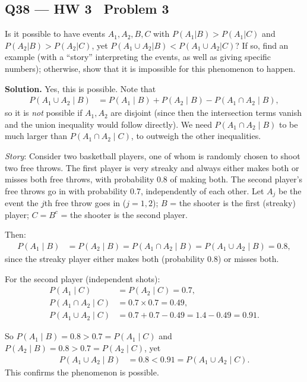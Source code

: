 \documentclass[11pt]{article}
\begin{document}
\subsection*{Q38 --- HW 3 \textperiodcentered\ Problem 3}
\begin{qbox}
Is it possible to have events $A_1, A_2, B, C$ with $P(A_1|B) > P(A_1|C)$ and $P(A_2|B) > P(A_2|C)$, yet $P(A_1 \cup A_2|B) < P(A_1 \cup A_2|C)$? If so, find an example (with a ``story'' interpreting the events, as well as giving specific numbers); otherwise, show that it is impossible for this phenomenon to happen.
\end{qbox}
\textbf{Solution.} Yes, this is possible. Note that
\begin{align*}
P(A_1\cup A_2\mid B) &= P(A_1\mid B)+P(A_2\mid B)-P(A_1\cap A_2\mid B),
\end{align*}
so it is \emph{not} possible if $A_1,A_2$ are disjoint (since then the intersection terms vanish and the union inequality would follow directly). We need $P(A_1\cap A_2\mid B)$ to be much larger than $P(A_1\cap A_2\mid C)$, to outweigh the other inequalities.

\textit{Story}: Consider two basketball players, one of whom is randomly chosen to shoot two free throws. The first player is very streaky and always either makes both or misses both free throws, with probability 0.8 of making both. The second player's free throws go in with probability 0.7, independently of each other. Let $A_j$ be the event the $j$th free throw goes in ($j=1,2$); $B$ = the shooter is the first (streaky) player; $C=B^c$ = the shooter is the second player.

Then:
\begin{align*}
P(A_1\mid B) &= P(A_2\mid B) = P(A_1\cap A_2\mid B) = P(A_1\cup A_2\mid B) = 0.8,
\end{align*}
since the streaky player either makes both (probability 0.8) or misses both.

For the second player (independent shots):
\begin{align*}
P(A_1\mid C) &= P(A_2\mid C) = 0.7,\\
P(A_1\cap A_2\mid C) &= 0.7\times 0.7 = 0.49,\\
P(A_1\cup A_2\mid C) &= 0.7+0.7-0.49 = 1.4-0.49 = 0.91.
\end{align*}

So $P(A_1\mid B)=0.8 > 0.7=P(A_1\mid C)$ and $P(A_2\mid B)=0.8>0.7=P(A_2\mid C)$, yet
\begin{align*}
P(A_1\cup A_2 \mid B) &= 0.8 < 0.91 = P(A_1\cup A_2\mid C).
\end{align*}
This confirms the phenomenon is possible.
\end{document}
